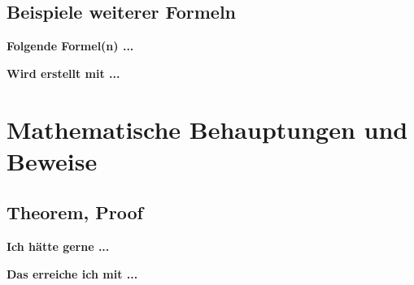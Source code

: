 \documentclass[twoside, 
               a4paper, 
               10pt, 
               parskip=full, 
               sectionentrydots=true, 
               listof=totoc, 
               listof=entryprefix,
               numbers=endperiod]{scrartcl}
\begin{document}
\newpage
\subsection{Beispiele weiterer Formeln}
{\textbf {Folgende Formel(n) ...}}
\begin{miniSeite}[colbacktitle=black!35!white,title=Ausdruck]

\end{miniSeite}
\begin{miniSeite}[colbacktitle=black!35!white,title=Ausdruck]

\end{miniSeite}

\newpage
{\textbf {Wird erstellt mit ...}}
\begin{miniSeite}[colbacktitle=black!35!white,title=\LaTeX-Code]

\end{miniSeite}
\begin{miniSeite}[colbacktitle=black!35!white,title=\LaTeX-Code]

\end{miniSeite}



\newpage
\section{Mathematische Behauptungen und Beweise}
\subsection{Theorem, Proof}

{\textbf {Ich hätte gerne ...}}
 
\begin{miniSeite}[colbacktitle=black!35!white,title=Ausdruck]

\end{miniSeite}


\newpage
{\textbf {Das erreiche ich mit ...}}
 
\begin{miniSeite}[colbacktitle=black!35!white,title=\LaTeX-Code]

\end{miniSeite}




\end{document}
